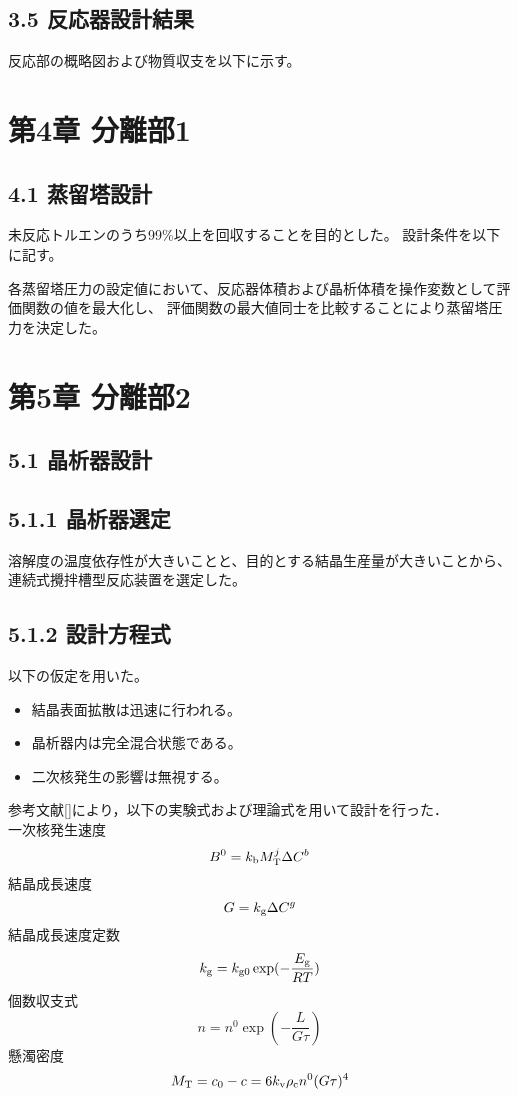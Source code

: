 \documentclass[platex, a4j]{jsarticle}
\begin{document}
\subsection*{3.5 反応器設計結果}
反応部の概略図および物質収支を以下に示す。

\newpage
\section*{第4章 分離部1}
\subsection*{4.1 蒸留塔設計}
未反応トルエンのうち99\%以上を回収することを目的とした。
設計条件を以下に記す。

各蒸留塔圧力の設定値において、反応器体積および晶析体積を操作変数として評価関数の値を最大化し、
評価関数の最大値同士を比較することにより蒸留塔圧力を決定した。

\newpage
\section*{第5章 分離部2}
\subsection*{5.1 晶析器設計}
\subsection*{5.1.1 晶析器選定}
溶解度の温度依存性が大きいことと、目的とする結晶生産量が大きいことから、
連続式攪拌槽型反応装置を選定した。
\subsection*{5.1.2 設計方程式}
以下の仮定を用いた。
\begin{itemize}
    \item 結晶表面拡散は迅速に行われる。\\
    \item 晶析器内は完全混合状態である。\\
    \item 二次核発生の影響は無視する。
\end{itemize}

参考文献[]により，以下の実験式および理論式を用いて設計を行った．\\
一次核発生速度
\begin{equation}
    B^0 = k_{{\rm b}}M_{{\rm T}}^j \Delta C^b
\end{equation}
結晶成長速度
\begin{equation}
    G = k_{{\rm g}}\Delta C^g
\end{equation}
結晶成長速度定数
\begin{equation}
    k_{{\rm g}} = k_{{\rm g0}} \exp(-\frac{E_{{\rm g}}}{RT})
\end{equation}
個数収支式
\begin{equation}
    n=n^0 \exp(-\frac{L}{G\tau})
\end{equation}
懸濁密度
\begin{equation}
    M_{{\rm T}} = c_0-c = 6k_{{\rm v}}\rho_{{\rm c}}n^0(G\tau)^4
\end{equation}
\end{document}
